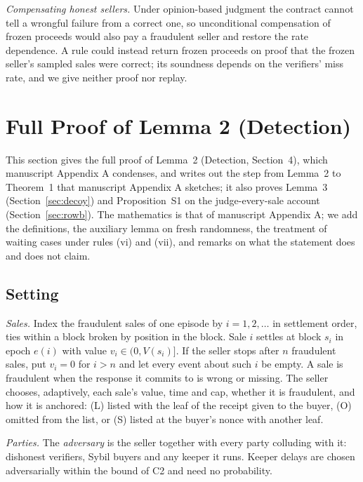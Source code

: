 \documentclass[10pt,a4paper]{article}
\theoremstyle{plain}
\theoremstyle{remark}
\begin{document}
\emph{Compensating honest sellers.} Under opinion-based judgment the contract cannot tell a wrongful failure from a correct one, so unconditional compensation of frozen proceeds would also pay a fraudulent seller and restore the rate dependence. A rule could instead return frozen proceeds on proof that the frozen seller's sampled sales were correct; its soundness depends on the verifiers' miss rate, and we give neither proof nor replay.

\setcounter{section}{2}\setcounter{table}{5}
\section{Full Proof of Lemma 2 (Detection)}
\label{sec:s1}

This section gives the full proof of Lemma~2 (Detection, Section~4), which manuscript Appendix A condenses, and writes out the step from Lemma~2 to Theorem~1 that manuscript Appendix A sketches; it also proves Lemma~3 (Section~\ref{sec:decoy}) and Proposition~S1 on the judge-every-sale account (Section~\ref{sec:rowb}). The mathematics is that of manuscript Appendix A; we add the definitions, the auxiliary lemma on fresh randomness, the treatment of waiting cases under rules (vi) and (vii), and remarks on what the statement does and does not claim.

\subsection{Setting}

\emph{Sales.} Index the fraudulent sales of one episode by $i=1,2,\dots$ in settlement order, ties within a block broken by position in the block. Sale $i$ settles at block $s_i$ in epoch $e(i)$ with value $v_i\in(0,V(s_i)]$. If the seller stops after $n$ fraudulent sales, put $v_i=0$ for $i>n$ and let every event about such $i$ be empty. A sale is fraudulent when the response it commits to is wrong or missing. The seller chooses, adaptively, each sale's value, time and cap, whether it is fraudulent, and how it is anchored: (L) listed with the leaf of the receipt given to the buyer, (O) omitted from the list, or (S) listed at the buyer's nonce with another leaf.

\emph{Parties.} The \emph{adversary} is the seller together with every party colluding with it: dishonest verifiers, Sybil buyers and any keeper it runs. Keeper delays are chosen adversarially within the bound of C2 and need no probability.
\end{document}
